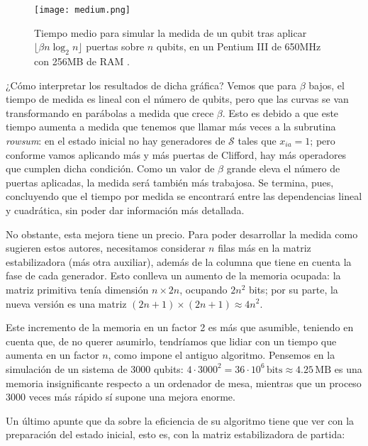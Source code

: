 \documentclass[11pt,a4paper,twoside,pdf]{article}
\numberwithin{equation}{section}
\begin{document}
		\begin{figure}[h!]
			\centering
			\texttt{[image: medium.png]}				
			\caption{ Tiempo medio para simular la medida de un qubit tras aplicar $\lfloor \beta n \log_2 n \rfloor$ puertas sobre $n$ qubits, en un Pentium III de 650MHz con 256MB de RAM \cite{Aaronson}.}
			 \label{fig: Aaronson}
		\end{figure}
	
	¿Cómo interpretar los resultados de dicha gráfica? Vemos que para $\beta$ bajos, el tiempo de medida es lineal con el número de qubits, pero que las curvas se van transformando en parábolas a medida que crece $\beta$. Esto es debido a que este tiempo aumenta a medida que tenemos que llamar más veces a la subrutina \textit{rowsum}: en el estado inicial no hay generadores de $\mathcal{S}$ tales que $x_{ia}=1$; pero conforme vamos aplicando más y más puertas de Clifford, hay más operadores que cumplen dicha condición. Como un valor de $\beta$ grande eleva el número de puertas aplicadas, la medida será también más trabajosa. Se termina, pues, concluyendo que el tiempo por medida se encontrará entre las dependencias lineal y  cuadrática, sin poder dar información más detallada.
	
	\vspace{0.35cm}
	
	No obstante, esta mejora tiene un precio. Para poder desarrollar la medida como sugieren estos autores, necesitamos considerar $n$ filas más en la matriz estabilizadora (más otra auxiliar), además de la columna que tiene en cuenta la fase de cada generador. Esto conlleva un aumento de la memoria ocupada: la matriz primitiva tenía dimensión $n \times 2n$, ocupando $2n^2$ bits; por su parte, la nueva versión es una matriz $(2n+1)\times(2n+1)\approx4n^2$.
	
	Este incremento de la memoria en un factor 2 es más que asumible, teniendo en cuenta que, de no querer asumirlo, tendríamos que lidiar con un tiempo que aumenta en un factor $n$, como impone el  antiguo algoritmo. Pensemos en la simulación de un sistema de 3000 qubits: $4\cdot 3000^2 = 36\cdot10^6\, \text{bits} \approx 4.25\, \text{MB}$ es una memoria insignificante respecto a un ordenador de mesa, mientras que un proceso 3000 veces más rápido sí supone una mejora enorme. 
	
	Un último apunte que \cite{Aaronson} da sobre la eficiencia de su algoritmo tiene que ver con la preparación del estado inicial, esto es, con la matriz estabilizadora de partida:
	
\end{document}
